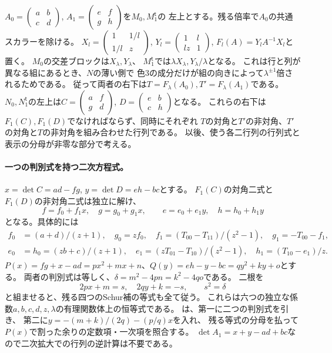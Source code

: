 $A_0=\left(\begin{smallmatrix}a&b\\c&d\end{smallmatrix}\right)$,
$A_1=\left(\begin{smallmatrix}e&f\\g&h\end{smallmatrix}\right)$を$M_0,M_1^{\mathsf t}$の
左上とする。残る倍率で$A_0$の共通スカラーを除ける。
$X_l=\left(\begin{smallmatrix}1&1/l\\1/l&z\end{smallmatrix}\right)$,
$Y_l=\left(\begin{smallmatrix}1&l\\lz&1\end{smallmatrix}\right)$,
$F_l(A)=Y_l A^{-1}X_l$と置く。
$M_0$の交差ブロックは$X_\lambda,Y_\lambda$、
$M_1^{\mathsf t}$では$\lambda X_\lambda,Y_\lambda/\lambda$となる。
これは行と列が異なる組にあるとき、$N$の薄い側で
色3の成分だけが組の向きによって$\lambda^{\pm1}$倍されるためである。
従って両者の右下は$T=F_\lambda(A_0),T'=F_\lambda(A_1)$である。
$N_0,N_1^{\mathsf t}$の左上は$C=\left(\begin{smallmatrix}a&f\\g&d\end{smallmatrix}\right)$,
$D=\left(\begin{smallmatrix}e&b\\c&h\end{smallmatrix}\right)$となる。
これらの右下は$F_1(C),F_1(D)$でなければならず、同時にそれぞれ
$T$の対角と$T'$の非対角、$T'$の対角と$T$の非対角を組み合わせた行列である。
以後、使う各二行列の行列式と表示の分母が非零な部分で考える。

\paragraph{一つの判別式を持つ二次方程式。}
$x=\det C=ad-fg$, $y=\det D=eh-bc$とする。
$F_1(C)$の対角二式と$F_1(D)$の非対角二式は独立に解け、
\[
 f=f_0+f_1x,\quad g=g_0+g_1x,\qquad e=e_0+e_1y,\quad h=h_0+h_1y
\]
となる。具体的には
\[
\begin{split}
 f_0&=(a+d)/(z+1),\quad g_0=z f_0,\quad
 f_1=(T_{00}-T_{11})/(z^2-1),\quad g_1=-T_{00}-f_1,\\
 e_0&=h_0=(zb+c)/(z+1),\quad
 e_1=(zT_{01}-T_{10})/(z^2-1),\quad h_1=(T_{10}-e_1)/z .
\end{split}
\]
$P(x)=fg+x-ad=p x^2+m x+n$、$Q(y)=eh-y-bc=q y^2+k y+o$とする。
両者の判別式は等しく、$\delta=m^2-4pn=k^2-4qo$である。
二根を
\[
             2p x+m=s,\quad 2q y+k=-s,\qquad s^2=\delta
\]
と組ませると、残る四つのSchur補の等式も全て従う。
これらは六つの独立な係数$a,b,c,d,z,\lambda$の有理関数体上の恒等式である。
は、第一に二つの判別式を引き、
第二に$y=-(m+k)/(2q)-(p/q)x$を入れ、
残る等式の分母を払って$P(x)$で割った余りの定数項・一次項を照合する。
$\det A_1=x+y-ad+bc$なので二次拡大での行列の逆計算は不要である。

